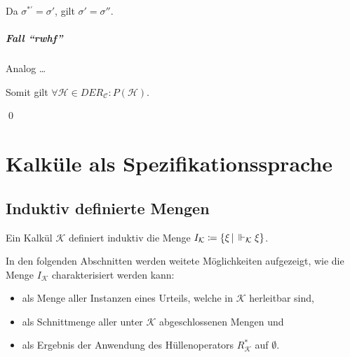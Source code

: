 				    Da $ \sigma ^ {*'} = \sigma' $, gilt $ \sigma' = \sigma'' $.
			    
			    \subparagraph{Fall \enquote{rwhf}}
				    Analog \dots
			    
			    Somit gilt $ \forall \mathcal{H} \in \textit{DER} _ \mathcal{C} : P(\mathcal{H}) $.
			    
			    \qed
    
    \section{Kalküle als Spezifikationssprache}
	    \subsection{Induktiv definierte Mengen}
		    Ein Kalkül $ \mathcal{K} $ definiert induktiv die Menge $ I _ \mathcal{K} \coloneqq \{ \xi \,\vert\, \Vdash _ \mathcal{K} \xi \} $.
		    
		    In den folgenden Abschnitten werden weitete Möglichkeiten aufgezeigt, wie die Menge $ I _ \mathcal{K} $ charakterisiert werden kann:
		    \begin{itemize}
		    	\item als Menge aller Instanzen eines Urteils, welche in $ \mathcal{K} $ herleitbar sind,
		    	\item als Schnittmenge aller unter $ \mathcal{K} $ abgeschlossenen Mengen und
		    	\item als Ergebnis der Anwendung des Hüllenoperators $ R _ \mathcal{K} ^ * $ auf $ \emptyset $.
		    \end{itemize}
	    
